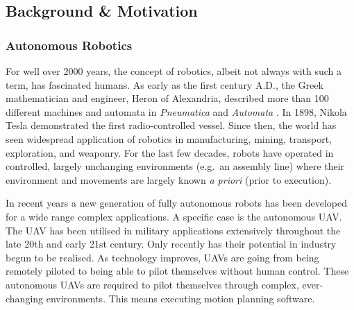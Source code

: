 
\subsection{Background \& Motivation}
    

    \subsubsection{Autonomous Robotics}
        For well over 2000 years, the concept of robotics, albeit not always with such a term, has fascinated humans. As early as the first century A.D., the Greek mathematician and engineer, Heron of Alexandria, described more than 100 different machines and \gls{automata} in \textit{Pneumatica} and \textit{Automata} \cite{Alexandrinus}. In 1898, Nikola Tesla demonstrated the first radio-controlled vessel. Since then, the world has seen widespread application of robotics in manufacturing, mining, transport, exploration, and weaponry. For the last few decades, robots have operated in controlled, largely unchanging environments (e.g.\ an assembly line) where their environment and movements are largely known \textit{\gls{a priori}} (prior to execution).

        In recent years a new generation of fully autonomous robots has been developed for a wide range complex applications. A specific case is the autonomous \gls{UAV}. The \gls{UAV} has been utilised in military applications extensively throughout the late 20th and early 21st century. Only recently has their potential in industry begun to be realised. As technology improves, \glspl{UAV} are going from being remotely piloted to being able to pilot themselves without human control. These autonomous \glspl{UAV} are required to pilot themselves through complex, ever-changing environments. This means executing motion planning software.

